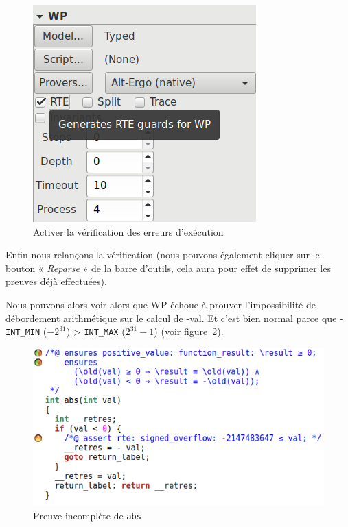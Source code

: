 \documentclass[12pt,francais,]{scrbook}
\begin{document}
\begin{figure}[htbp]
\centering
\includegraphics[scale=0.5]{2-1-1-abs-3.png}
\caption{Activer la vérification des erreurs d'exécution}
\label{fig:2-1-1-abs-3}
\end{figure}

Enfin nous relançons la vérification (nous pouvons également cliquer sur
le bouton « \emph{Reparse} » de la barre d'outils, cela aura pour effet
de supprimer les preuves déjà effectuées).

Nous pouvons alors voir alors que WP échoue à prouver l'impossibilité de
débordement arithmétique sur le calcul de -val. Et c'est bien normal
parce que -\texttt{INT\_MIN} (\(-2^{31}\)) \textgreater{}
\texttt{INT\_MAX} (\(2^{31}-1\)) (voir figure~\ref{fig:2-1-1-abs-4}).

\begin{figure}[htbp]
\centering
\includegraphics[scale=0.5]{2-1-1-abs-4.png}
\caption{Preuve incomplète de \texttt{abs}}
\label{fig:2-1-1-abs-4}
\end{figure}
\end{document}
